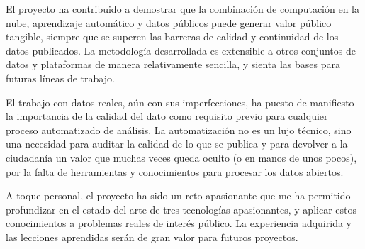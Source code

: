 El proyecto ha contribuido a demostrar que la combinación de computación en la nube, aprendizaje automático y datos públicos puede generar valor público tangible, siempre que se superen las barreras de calidad y continuidad de los datos publicados. La metodología desarrollada es extensible a otros conjuntos de datos y plataformas de manera relativamente sencilla, y sienta las bases para futuras líneas de trabajo.

El trabajo con datos reales, aún con sus imperfecciones, ha puesto de manifiesto la importancia de la calidad del dato como requisito previo para cualquier proceso automatizado de análisis. La automatización no es un lujo técnico, sino una necesidad para auditar la calidad de lo que se publica y para devolver a la ciudadanía un valor que muchas veces queda oculto (o en manos de unos pocos), por la falta de herramientas y conocimientos para procesar los datos abiertos.

A toque personal, el proyecto ha sido un reto apasionante que me ha permitido profundizar en el estado del arte de tres tecnologías apasionantes, y aplicar estos conocimientos a problemas reales de interés público. La experiencia adquirida y las lecciones aprendidas serán de gran valor para futuros proyectos.